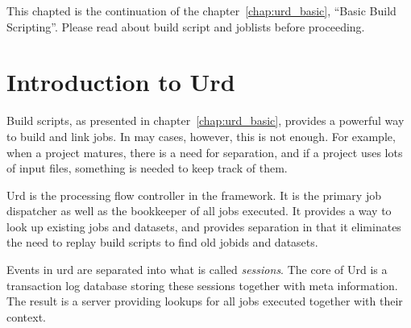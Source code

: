 
\label{chap:urd}

This chapted is the continuation of the chapter~\ref{chap:urd_basic},
``Basic Build Scripting''.  Please read about build script and
joblists before proceeding.


\section{Introduction to Urd}

Build scripts, as presented in chapter~\ref{chap:urd_basic}, provides
a powerful way to build and link jobs.  In may cases, however, this is
not enough.  For example, when a project matures, there is a need for
separation, and if a project uses lots of input files, something is
needed to keep track of them.

Urd is the processing flow controller in the framework.  It is the
primary job dispatcher as well as the bookkeeper of all jobs executed.
It provides a way to look up existing jobs and datasets, and provides
separation in that it eliminates the need to replay build scripts to
find old jobids and datasets.

Events in urd are separated into what is called \textsl{sessions}.
The core of Urd is a transaction log database storing these sessions
together with meta information.  The result is a server providing
lookups for all jobs executed together with their context.

